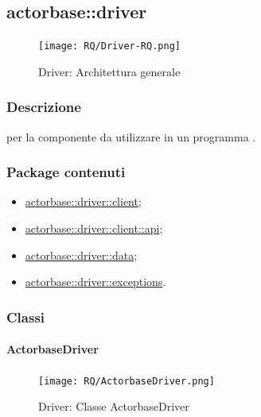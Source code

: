 \documentclass{scalatekids-article}
\begin{document}

\subsection{actorbase::driver}
\label{sec:actorbase::driver}

\begin{figure}[H]
  \begin{center}
    \texttt{[image: RQ/Driver-RQ.png]}
    \caption{Driver: Architettura generale}
  \end{center}
\end{figure}

\subsubsection{Descrizione}

 per la componente  da utilizzare in un programma
.

\subsubsection{Package contenuti}

\begin{itemize}
\item \hyperref[sec:actorbase::driver::client]{actorbase::driver::client};
\item \hyperref[sec:actorbase::driver::client::api]{actorbase::driver::client::api};
\item \hyperref[sec:actorbase::driver::data]{actorbase::driver::data};
\item \hyperref[sec:actorbase::driver::exceptions]{actorbase::driver::exceptions}.
\end{itemize}

\subsubsection{Classi}

\paragraph{ActorbaseDriver}
\label{sec:actorbase::driver::ActorbaseDriver}

\begin{figure}[H]
  \begin{center}
    \texttt{[image: RQ/ActorbaseDriver.png]}
    \caption{Driver: Classe ActorbaseDriver}
  \end{center}
\end{figure}
\end{document}

